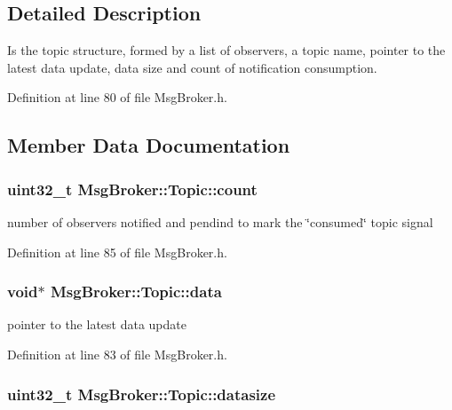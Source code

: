 \subsection{Detailed Description}
Is the topic structure, formed by a list of observers, a topic name, pointer to the latest data update, data size and count of notification consumption. 

Definition at line 80 of file Msg\-Broker.\-h.



\subsection{Member Data Documentation}
\hypertarget{struct_msg_broker_1_1_topic_a939161befbc15201a30852158dc22271}{
\subsubsection[{count}]{\setlength{\rightskip}{0pt plus 5cm}uint32\-\_\-t Msg\-Broker\-::\-Topic\-::count}}\label{struct_msg_broker_1_1_topic_a939161befbc15201a30852158dc22271}


number of observers notified and pendind to mark the \char`\"{}consumed\char`\"{} topic signal 



Definition at line 85 of file Msg\-Broker.\-h.

\hypertarget{struct_msg_broker_1_1_topic_ab3cecf94841562b7dcd62c36f3ee3be6}{
\subsubsection[{data}]{\setlength{\rightskip}{0pt plus 5cm}void$\ast$ Msg\-Broker\-::\-Topic\-::data}}\label{struct_msg_broker_1_1_topic_ab3cecf94841562b7dcd62c36f3ee3be6}


pointer to the latest data update 



Definition at line 83 of file Msg\-Broker.\-h.

\hypertarget{struct_msg_broker_1_1_topic_a8cc287ab37bc41fd6b671eacdcf7393a}{
\subsubsection[{datasize}]{\setlength{\rightskip}{0pt plus 5cm}uint32\-\_\-t Msg\-Broker\-::\-Topic\-::datasize}}\label{struct_msg_broker_1_1_topic_a8cc287ab37bc41fd6b671eacdcf7393a}


